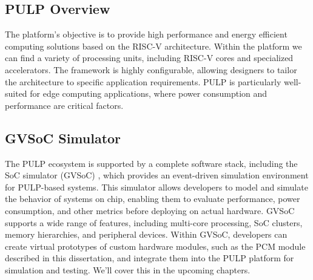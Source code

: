 \subsection{PULP Overview}\label{sec:pulp_ov}%
The platform's objective is to provide high performance and energy efficient computing solutions based on the RISC-V architecture.
Within the platform we can find a variety of processing units, including RISC-V cores and specialized accelerators.
The framework is highly configurable, allowing designers to tailor the architecture to specific application requirements.
PULP is particularly well-suited for edge computing applications, where power consumption and performance are critical factors.
\subsection{GVSoC Simulator}\label{sec:gvsoc}
The PULP ecosystem is supported by a complete software stack, including the SoC simulator (GVSoC) \cite{bruschi_gvsoc_2021},
 which provides an event-driven simulation environment for PULP-based systems.
This simulator allows developers to model and simulate the behavior of systems on chip, enabling them to evaluate performance,
 power consumption, and other metrics before deploying on actual hardware.
GVSoC supports a wide range of features, including multi-core processing, SoC clusters, memory hierarchies, and peripheral devices.
Within GVSoC, developers can create virtual prototypes of custom hardware modules, such as the PCM module described in this dissertation,
and integrate them into the PULP platform for simulation and testing.
We’ll cover this in the upcoming chapters.
